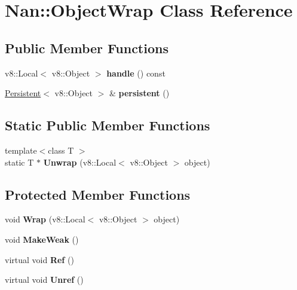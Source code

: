 \hypertarget{class_nan_1_1_object_wrap}{}\section{Nan\+:\+:Object\+Wrap Class Reference}
\label{class_nan_1_1_object_wrap}
\subsection*{Public Member Functions}
\begin{DoxyCompactItemize}
\item 
\mbox{\label{class_nan_1_1_object_wrap_aa7125cd78327e75ccf6c525e5e8f61f2}} 
v8\+::\+Local$<$ v8\+::\+Object $>$ {\bfseries handle} () const
\item 
\mbox{\label{class_nan_1_1_object_wrap_a0c033fcf116e5f606ed23a53dcd564eb}} 
\hyperlink{class_nan_1_1_persistent}{Persistent}$<$ v8\+::\+Object $>$ \& {\bfseries persistent} ()
\end{DoxyCompactItemize}
\subsection*{Static Public Member Functions}
\begin{DoxyCompactItemize}
\item 
\mbox{\label{class_nan_1_1_object_wrap_a81de241a846b291b893c1ddbb297db4b}} 
{\footnotesize template$<$class T $>$ }\\static T $\ast$ {\bfseries Unwrap} (v8\+::\+Local$<$ v8\+::\+Object $>$ object)
\end{DoxyCompactItemize}
\subsection*{Protected Member Functions}
\begin{DoxyCompactItemize}
\item 
\mbox{\label{class_nan_1_1_object_wrap_a119edfea0cc3348faf0fa5cb03668a4d}} 
void {\bfseries Wrap} (v8\+::\+Local$<$ v8\+::\+Object $>$ object)
\item 
\mbox{\label{class_nan_1_1_object_wrap_a36879fcae6b6ace707d6df1536e6a0ec}} 
void {\bfseries Make\+Weak} ()
\item 
\mbox{\label{class_nan_1_1_object_wrap_a7dd8ad55493f10bf0a3a07bfadd6620a}} 
virtual void {\bfseries Ref} ()
\item 
\mbox{\label{class_nan_1_1_object_wrap_a0bbe95e7d265dd51e6cdf49b33de1275}} 
virtual void {\bfseries Unref} ()
\end{DoxyCompactItemize}
